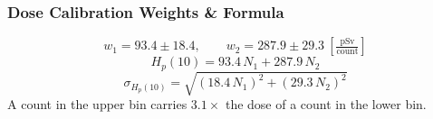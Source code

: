 \documentclass[aspectratio=169]{beamer}
\begin{document}

\begin{frame}
  \frametitle{Dose Calibration Weights \& Formula}
  \begin{equation*}
    w_1 = 93.4 \pm 18.4, \qquad w_2 = 287.9 \pm 29.3\ \left[\tfrac{\mathrm{pSv}}{\mathrm{count}}\right]
  \end{equation*}
  \begin{equation*}
    H_p(10) = 93.4\,N_1 + 287.9\,N_2
  \end{equation*}
  \begin{equation*}
    \sigma_{H_p(10)} = \sqrt{\left(18.4\,N_1\right)^2 + \left(29.3\,N_2\right)^2}
  \end{equation*}
  \vspace{-0.2cm}
  \footnotesize
  A count in the upper bin carries $3.1\times$ the dose of a count in the lower bin.
\end{frame}
\end{document}

